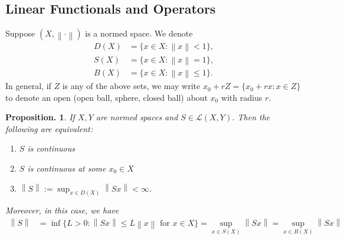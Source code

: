 \documentclass[11pt, a4paper]{memoir}
\newcommand{\norm}[1]{\ensuremath{\left\lVert#1\right\rVert}}
\theoremstyle{change}
\newtheorem{proposition}[theorem]{Proposition.}
\theoremstyle{plain}
\theoremstyle{nonumberplain}
\numberwithin{equation}{section}
\begin{document}
\subsection{Linear Functionals and Operators}
Suppose $(X,\norm{\cdot})$ is a normed space.
We denote
\begin{align*}
    D(X) &= \{x\in X:\norm{x}<1\},\\
    S(X) &= \{x\in X:\norm{x}=1\},\\
    B(X) &= \{x\in X:\norm{x}\leq 1\}.
\end{align*}
In general, if $Z$ is any of the above sets, we may write $x_0+rZ=\{x_0+rx:x\in Z\}$ to denote an open (open ball, sphere, closed ball) about $x_0$ with radius $r$.
\begin{proposition}
    If $X,Y$ are normed spaces and $S\in\mathcal{L}(X,Y)$.
    Then the following are equivalent:
    \begin{enumerate}[nl,r]
        \item $S$ is continuous
        \item $S$ is continuous at some $x_0\in X$
        \item $\norm{S}:=\sup_{x\in D(X)}\norm{Sx}<\infty$.
    \end{enumerate}
    Moreover, in this case, we have 
    \begin{align*}
        \norm{S}&=\inf\{L>0:\norm{Sx}\leq L\norm{x}\text{ for }x\in X\}= \sup_{x\in S(X)}\norm{Sx}=\sup_{x\in B(X)}\norm{Sx}
    \end{align*}
\end{proposition}
\end{document}
